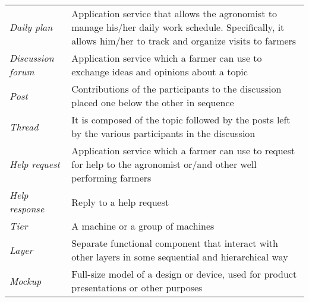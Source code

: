 \begin{center}
\begin{longtable}{|m{3.2cm}|m{8.3cm}|}
\textit{Daily plan} & Application service that allows the agronomist to manage his/her daily work schedule. Specifically, it allows him/her to track and organize visits to farmers\\
\textit{Discussion forum} & Application service which a farmer can use to exchange ideas and opinions about a topic\\
\textit{Post} & Contributions of the participants to the discussion placed one below the other in sequence\\
\textit{Thread} & It is composed of the topic followed by the posts left by the various participants in the discussion\\
\textit{Help request} & Application service which a farmer can use to request for help to the agronomist or/and other well performing farmers\\
\textit{Help response} & Reply to a help request\\
\textit{Tier} & A machine or a group of machines\\
\textit{Layer} & Separate functional component that interact with other layers in some sequential and hierarchical way\\
\textit{Mockup} & Full-size model of a design or device, used for product presentations or other purposes\\
\end{longtable}
\end{center}
\newpage